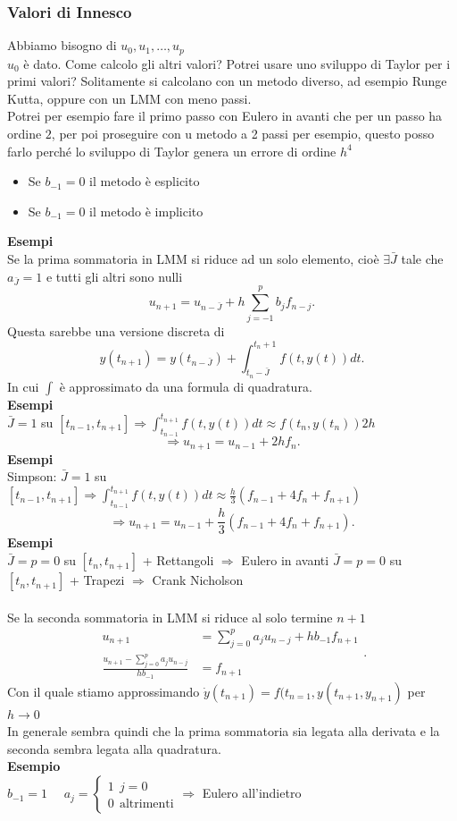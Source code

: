 \documentclass[12px]{article}
\begin{document}
\subsubsection{Valori di Innesco}
Abbiamo bisogno di $u_0,u_1,\ldots,u_p$\\
$u_0$ è dato. Come calcolo gli altri valori? Potrei usare uno sviluppo di Taylor per i primi valori? Solitamente si calcolano con un metodo diverso, ad esempio Runge Kutta, oppure con un LMM con meno passi.\\
Potrei per esempio fare il primo passo con Eulero in avanti che per un passo ha ordine $2$, per poi proseguire con u metodo a 2 passi per esempio, questo posso farlo perché lo sviluppo di Taylor  genera un errore di ordine $h^4$
 \begin{itemize}
	 \item Se $b_{-1} = 0$ il metodo è esplicito
	 \item Se $b_{-1}= 0$ il metodo è implicito
\end{itemize}
\textbf{Esempi}\\
Se la prima sommatoria in LMM si riduce ad un solo elemento, cioè $\exists \bar J$ tale che  $a_{\bar J}=1$ e  tutti gli altri sono nulli
 \[
	 u_{n+1} = u_{n-\bar J} + h \sum^{p}_{j=-1}b_jf_{n-j} 
.\] 
Questa sarebbe una versione discreta di
\[
	y(t_{n+1}) = y(t_{n-\bar J}) + \int_{t_n-\bar J}^{t_n + 1}f(t,y(t))dt
.\] 
In cui $\int$ è approssimato da una formula di quadratura.\\
\textbf{Esempi}\\
$\bar J =1$ su  $[t_{n-1}, t_{n+1}] \Rightarrow \int_{t_{n-1}}^{t_{n+1}}f(t,y(t))dt\approx f(t_n,y(t_n))2h$
\[
	\Rightarrow u_{n+1} = u_{n-1} + 2hf_n
.\] 
\textbf{Esempi}\\
Simpson: $\bar J = 1$ su  $\displaystyle[t_{n-1},t_{n+1}] \Rightarrow  \int_{t_{n-1}}^{t_{n+1}}f(t,y(t))dt\approx \frac h 3(f_{n-1} + 4f_n + f_{n+1})$
\[
	\Rightarrow  u_{n+1} = u_{n-1} + \frac h 3 (f_{n-1} + 4f_n + f_{n+1})
.\] 
\textbf{Esempi}\\
$\bar J = p = 0 $ su  $[t_{n},t_{n+1}]$ + Rettangoli $ \Rightarrow $ Eulero in avanti
$\bar J = p = 0 $ su  $[t_{n},t_{n+1}]$ + Trapezi $ \Rightarrow $ Crank Nicholson\\
\hline\ \\
Se la seconda sommatoria in LMM si riduce al solo termine $n+1$
\[
\begin{split}
	u_{n+1} &= \sum^{p}_{j=0}a_ju_{n-j} + h b_{-1}f_{n+1}\\
	\frac{u_{n+1} - \sum^{p}_{j=0}a_j u_{n-j}}{hb_{-1}} &= f_{n+1}
\end{split}
.\] 
Con il quale stiamo approssimando $\dot y(t_{n+1}) = f(t_{n=1},y(t_{n+1},y_{n+1})$ per  $h \rightarrow 0$\\[10px]
In generale sembra quindi che la prima sommatoria sia legata alla derivata e la seconda sembra legata alla quadratura.\\
\textbf{Esempio}\\
$b_{-1} = 1$  \ \  $a_j = \begin{cases}
	1 \ \ j =0 \\
	0 \ \ \text{altrimenti}
\end{cases} \Rightarrow  $ Eulero all'indietro
\end{document}
